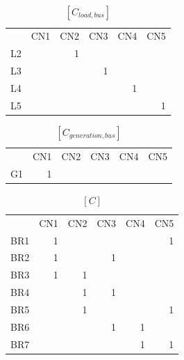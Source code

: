 \documentclass[nols,a4paper,twoside,notoc,fleqn]{tufte-book}
\begin{document}
\begin{table}[h!]
	\begin{tabular}{lrrrrr}
		{} &  CN1 &  CN2 &  CN3 &  CN4 &  CN5 \\
		L2 &      &    1 &      &      &      \\
		L3 &      &      &    1 &      &      \\
		L4 &      &      &      &    1 &      \\
		L5 &      &      &      &      &    1 \\
	\end{tabular}
\caption{$[C_{load, bus}]$}
\end{table}








\begin{table}[h!]
	\begin{tabular}{lrrrrr}
		{} &  CN1 &  CN2 &  CN3 &  CN4 &  CN5 \\
		G1 &    1 &      &      &      &      \\
	\end{tabular}
\caption{$[C_{generation, bus}]$}
\end{table}




\begin{table}[h!]
	\begin{tabular}{lrrrrr}
		{} &  CN1 &  CN2 &  CN3 &  CN4 &  CN5 \\
		BR1 &    1 &      &      &      &    1 \\
		BR2 &    1 &      &    1 &      &      \\
		BR3 &    1 &    1 &      &      &      \\
		BR4 &      &    1 &    1 &      &      \\
		BR5 &      &    1 &      &      &    1 \\
		BR6 &      &      &    1 &    1 &      \\
		BR7 &      &      &      &    1 &    1 \\
	\end{tabular}
\caption{$[C]$}
\end{table}
\end{document}
